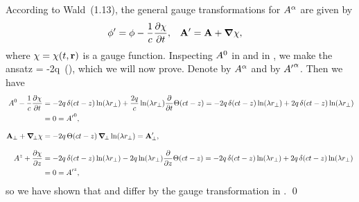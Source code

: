 \begin{solution}
	According to Wald~(1.13), the general gauge transformations for $A^\alpha$ are given by
	\begin{align*}
		\phi' &= \phi - \frac{1}{c} \pdv{\chi}{t}, &
		\vb{A}' &= \vb{A} + \grad\chi,
	\end{align*}
	where $\chi = \chi(t, \vb{r})$ is a gauge function.  Inspecting $A^0$ in  and in , we make the ansatz
	\beqn \label{chi}
		{\color{blue} \chi = -2q \,\Thtctz \ln(\lam \rperp)},
	\eeqn
	which we will now prove.  Denote  by $A^\alpha$ and  by ${A'}^\alpha$.  Then we have
	\begin{align*}
		A^0 - \frac{1}{c} \pdv{\chi}{t} &= -2q \,\delta(ct - z) \ln(\lambda r_\perp) + \frac{2q}{c} \ln(\lambda r_\perp) \pdv{t} \Theta(ct - z)
		= -2q \,\delta(ct - z) \ln(\lambda r_\perp) + 2q \,\delta(ct - z) \ln(\lambda r_\perp) \\
		&= 0
		= {A'}^0, \\[2ex]
		\vb{A}_\perp + \grad_{\!\perp} \chi &= -2q \,\Theta(ct - z) \, \grad_{\!\perp} \ln(\lambda r_\perp)
		= \vb{A}_\perp', \\[2ex]
		A^z + \pdv{\chi}{z} &= -2q \,\delta(ct - z) \ln(\lambda r_\perp) - 2q \ln(\lambda r_\perp) \pdv{z} \Theta(ct - z)
		= -2q \,\delta(ct - z) \ln(\lambda r_\perp) + 2q \,\delta(ct - z) \ln(\lambda r_\perp) \\
		&= 0
		= {A'}^z,
	\end{align*}
	so we have shown that  and  differ by the gauge transformation in . \qed
\end{solution}